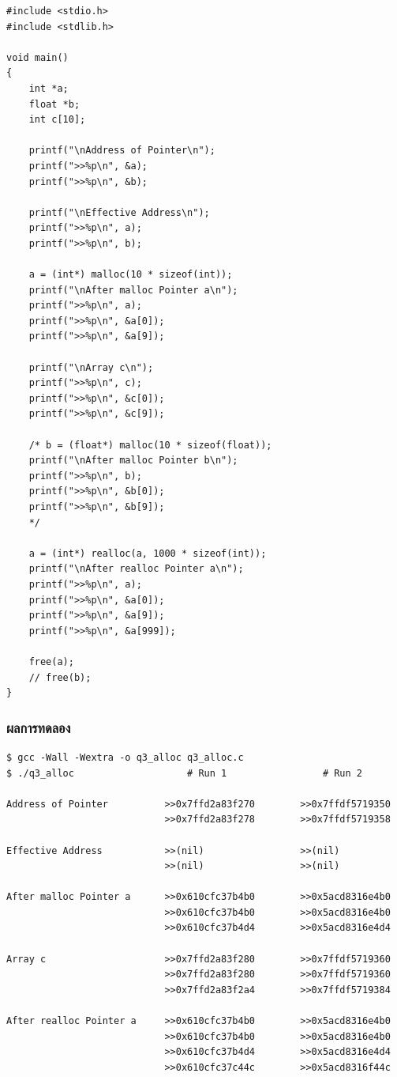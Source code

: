 \documentclass[a4paper,11pt]{article}
\newcommand{\code}[1]{\texttt{#1}}
\begin{document}
\begin{lstlisting}[style=cstyle,caption={\code{src/q3\_alloc.c} โค้ดเริ่มต้นตามใบงาน (ยังคอมเมนต์ส่วนของ \code{b} ไว้)}]
#include <stdio.h>
#include <stdlib.h>

void main()
{
    int *a;
    float *b;
    int c[10];

    printf("\nAddress of Pointer\n");
    printf(">>%p\n", &a);
    printf(">>%p\n", &b);

    printf("\nEffective Address\n");
    printf(">>%p\n", a);
    printf(">>%p\n", b);

    a = (int*) malloc(10 * sizeof(int));
    printf("\nAfter malloc Pointer a\n");
    printf(">>%p\n", a);
    printf(">>%p\n", &a[0]);
    printf(">>%p\n", &a[9]);

    printf("\nArray c\n");
    printf(">>%p\n", c);
    printf(">>%p\n", &c[0]);
    printf(">>%p\n", &c[9]);

    /* b = (float*) malloc(10 * sizeof(float));
    printf("\nAfter malloc Pointer b\n");
    printf(">>%p\n", b);
    printf(">>%p\n", &b[0]);
    printf(">>%p\n", &b[9]);
    */

    a = (int*) realloc(a, 1000 * sizeof(int));
    printf("\nAfter realloc Pointer a\n");
    printf(">>%p\n", a);
    printf(">>%p\n", &a[0]);
    printf(">>%p\n", &a[9]);
    printf(">>%p\n", &a[999]);

    free(a);
    // free(b);
}
\end{lstlisting}

\subsubsection{ผลการทดลอง}

\begin{lstlisting}[style=terminal,caption={ผลการทดลอง Step 1--2 (รัน 2 ครั้งเพื่อเปรียบเทียบระยะห่าง)}]
$ gcc -Wall -Wextra -o q3_alloc q3_alloc.c
$ ./q3_alloc                    # Run 1                 # Run 2

Address of Pointer          >>0x7ffd2a83f270        >>0x7ffdf5719350
                            >>0x7ffd2a83f278        >>0x7ffdf5719358

Effective Address           >>(nil)                 >>(nil)
                            >>(nil)                 >>(nil)

After malloc Pointer a      >>0x610cfc37b4b0        >>0x5acd8316e4b0
                            >>0x610cfc37b4b0        >>0x5acd8316e4b0
                            >>0x610cfc37b4d4        >>0x5acd8316e4d4

Array c                     >>0x7ffd2a83f280        >>0x7ffdf5719360
                            >>0x7ffd2a83f280        >>0x7ffdf5719360
                            >>0x7ffd2a83f2a4        >>0x7ffdf5719384

After realloc Pointer a     >>0x610cfc37b4b0        >>0x5acd8316e4b0
                            >>0x610cfc37b4b0        >>0x5acd8316e4b0
                            >>0x610cfc37b4d4        >>0x5acd8316e4d4
                            >>0x610cfc37c44c        >>0x5acd8316f44c
\end{lstlisting}
\end{document}

